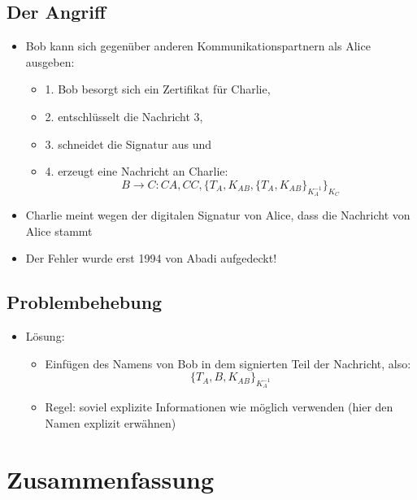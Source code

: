 \documentclass[openany]{book}
\begin{document}
\subsection{Der Angriff}

\begin{itemize}
    \item Bob kann sich gegenüber anderen Kommunikationspartnern als Alice ausgeben:
    \begin{itemize}
        \item 1. Bob besorgt sich ein Zertifikat für Charlie,
        \item 2. entschlüsselt die Nachricht 3,
        \item 3. schneidet die Signatur aus und
        \item 4. erzeugt eine Nachricht an Charlie: $$B\rightarrow C:CA,CC,\{ T_A, K_{AB}, \{ T_A, K_{AB}\} _{K_A^{-1}}\} _{K_C}$$ 
    \end{itemize}
    \item Charlie meint wegen der digitalen Signatur von Alice, dass die Nachricht von Alice stammt
    \item Der Fehler wurde erst 1994 von Abadi aufgedeckt!
\end{itemize}

\subsection{Problembehebung}

\begin{itemize}
    \item Lösung:
    \begin{itemize}
        \item Einfügen des Namens von Bob in dem signierten Teil der Nachricht, also: $$\{ T_A,B,K_{AB}\} _{K_A^{-1}}$$
        \item Regel: soviel explizite Informationen wie möglich verwenden (hier den Namen explizit erwähnen)
    \end{itemize}
\end{itemize}

\section{Zusammenfassung}
\end{document}
